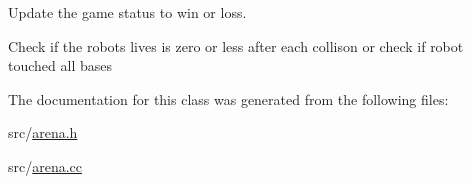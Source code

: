 Update the game status to win or loss. 

Check if the robots lives is zero or less after each collison or check if robot touched all bases 

The documentation for this class was generated from the following files\+:\begin{DoxyCompactItemize}
\item 
src/\hyperlink{arena_8h}{arena.\+h}\item 
src/\hyperlink{arena_8cc}{arena.\+cc}\end{DoxyCompactItemize}

